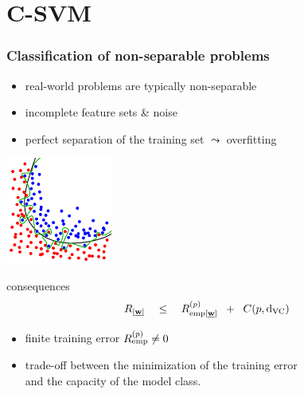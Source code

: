 \section{C-SVM}


\begin{frame}\frametitle{Classification of non-separable problems}
	\begin{minipage}{12cm}
		\begin{minipage}{6cm}
			\begin{itemize}
				\item  real-world problems are typically non-separable
				\vspace{1mm}
				\item incomplete feature sets \& noise
				\vspace{1mm}
				\item perfect separation of the training set $\leadsto$ overfitting
			\end{itemize}
		\end{minipage}
		\hfill
		\begin{minipage}{4.5cm}
			\includegraphics[height=3.5cm]{img/overfitting-classification.png}
		\end{minipage}
	\end{minipage}
	
	\pause

	\begin{block}{consequences}
		$$
			R_{[\underline{\mathbf{w}}]} \quad\leq\quad 
			R_{\operatorname{emp} [\underline{\mathbf{w}}]}^{(p)} \;\;+\;\; C(p,\mathrm{d}_{\mathrm{VC}})
		$$
		\vspace{-3mm}
		\begin{itemize}
			\item finite training error $R_{\operatorname{emp}}^{(p)} \neq 0$ 
			\item trade-off between the minimization of the training error \\
		  		and the capacity of the model class.\\
		  		

\end{itemize}
\end{block}
\end{frame}
